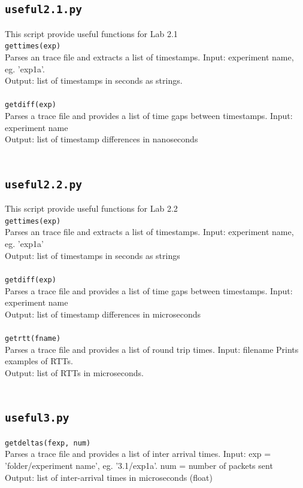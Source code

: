 \documentclass[]{scrartcl}
\begin{document}
\subsection{\texttt{useful2.1.py}}
This script provide useful functions for Lab 2.1\\

\texttt{gettimes(exp)}  \\
Parses an trace file and extracts a list of timestamps.
Input: experiment name, eg. 'exp1a'.  \\ 
Output: list of timestamps in seconds as strings. \\
\\
\texttt{getdiff(exp)}  \\
Parses a trace file and provides a list of time gaps between timestamps.
Input: experiment name  \\
Output: list of timestamp differences in nanoseconds  \\
\\

\subsection{\texttt{useful2.2.py}}
This script provide useful functions for Lab 2.2\\

\texttt{gettimes(exp)}  \\
Parses an trace file and extracts a list of timestamps.
Input: experiment name, eg. 'exp1a'  \\ 
Output: list of timestamps in seconds as strings \\
\\
\texttt{getdiff(exp)}  \\
Parses a trace file and provides a list of time gaps between timestamps.
Input: experiment name    \\
Output: list of timestamp differences in microseconds  \\
\\
\texttt{getrtt(fname)}  \\
Parses a trace file and provides a list of round trip times.
Input: filename
Prints examples of RTTs. \\
Output: list of RTTs in microseconds. \\
\\
\subsection{\texttt{useful3.py}}
\texttt{getdeltas(fexp, num)} \\  
Parses a trace file and provides a list of inter arrival times.
Input: exp = 'folder/experiment name', eg. '3.1/exp1a'. num = number of packets sent  \\
Output: list of inter-arrival times in microseconds (float)   
\end{document}
